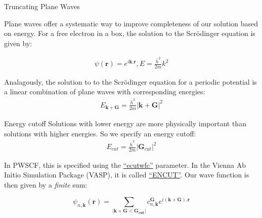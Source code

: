 \documentclass[aspectratio=169]{beamer}
\let \vec \mathbf
\begin{document}
\begin{frame}{Truncating Plane Waves}

Plane waves offer a systematic way to improve completeness of our solution based on energy. \newline
\newline
For a free electron in a box, the solution to the Scr\"odinger equation is given by:

\begin{eqnarray*}
\psi(\vec{r}) = e^{i\vec{k}.\vec{r}}, E = \frac{\bar{h}^2}{2m}k^2
\end{eqnarray*} 

Analagously, the solution to to the Scr\"odinger equation for a periodic potential is a linear combination of plane waves with corresponding energies:
\begin{eqnarray*}
E_{\vec{k}+\vec{G}} = \frac{\bar{h}^2}{2m}|\vec{k}+\vec{G}|^2
\end{eqnarray*} 

\end{frame} 

\begin{frame}{Energy cutoff}
Solutions with lower energy are more physically important than solutions with higher energies. So we specify an energy cutoff:
\begin{eqnarray*}
E_{cut} = \frac{\bar{h}^2}{2m}|\vec{G}_{cut}|^2
\end{eqnarray*}

In PWSCF, this is specified using the \href{https://www.quantum-espresso.org/Doc/INPUT_PW.html}{``ecutwfc''} parameter. In the Vienna Ab Initio Simulation Package (VASP), it is called \href{https://www.vasp.at/wiki/index.php/ENCUT}{``ENCUT''}.\newline
\newline
Our wave function is then given by a \textit{finite} sum:

\begin{equation*}
\psi_{n,\vec{k}}(\vec{r}) = \sum_{|\vec{k}+\vec{G}<\vec{G_{cut}}|} c^{\vec{G}}_{n,\vec{k}} e^{i(\vec{k}+\vec{G}).\vec{r}}
\end{equation*} 

\end{frame} 
\end{document}
